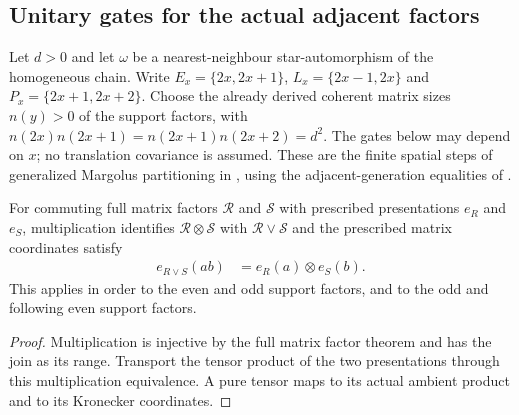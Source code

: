 \subsection{Unitary gates for the actual adjacent factors}
\label{sec:qca_margolus_unitary_gates}

Let $d>0$ and let $\omega$ be a nearest-neighbour star-automorphism of the
homogeneous chain. Write $E_x=\{2x,2x+1\}$,
$L_x=\{2x-1,2x\}$ and $P_x=\{2x+1,2x+2\}$.
Choose the already derived coherent matrix sizes $n(y)>0$ of the support
factors, with $n(2x)n(2x+1)=n(2x+1)n(2x+2)=d^2$.
The gates below may depend on $x$; no translation covariance is assumed.
These are the finite spatial steps of generalized Margolus partitioning
in \cite[equations~bruleU and bruleV, lines~980--1001]{SchumacherWerner2004QCA},
using the adjacent-generation equalities of
\cite[lines~1276--1318]{Gross2012IndexTheory}.

\begin{lemma}
    \label{lem:qca_commuting_product_coordinates}
    \leanok
    For commuting full matrix factors $\mathcal R$ and $\mathcal S$ with
    prescribed presentations $e_R$ and $e_S$, multiplication identifies
    $\mathcal R\otimes\mathcal S$ with $\mathcal R\vee\mathcal S$ and
    the prescribed matrix coordinates satisfy
    \begin{align}
        e_{R\vee S}(ab) & =e_R(a)\otimes e_S(b).
    \end{align}
    This applies in order to the even and odd support factors, and to
    the odd and following even support factors.
\end{lemma}
\begin{proof}
    \leanok
    Multiplication is injective by the full matrix factor theorem and
    has the join as its range. Transport the tensor product of the two
    presentations through this multiplication equivalence. A pure tensor
    maps to its actual ambient product and to its Kronecker coordinates.
\end{proof}

